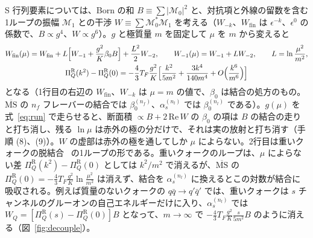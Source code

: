 \documentclass[a4paper,10pt]{ltjsarticle}
\newcommand{\MSbar}{\overline{\mathrm{MS}}}
\begin{document}
S 行列要素については、Born の和 $B\equiv\sum|\mathcal M_0|^2$ と、対抗項と外線の留数を含む1ループの振幅 $\mathcal M_1$ との干渉 $W\equiv\sum\mathcal M_0^*\mathcal M_1$ を考える（$W_{-k}$、$W_{\mathrm{fin}}$ は $\epsilon^{-k}$、$\epsilon^0$ の係数で、$B\propto g^4$、$W\propto g^6$）。$g$ と極質量 $m$ を固定して $\mu$ を $m$ から変えると
\begin{equation}
\begin{gathered}
W_{\mathrm{fin}}(\mu)=W_{\mathrm{fin}}+L\Bigl[W_{-1}+\frac{g^2}{K}\beta_0B\Bigr]+\frac{L^2}2W_{-2},\qquad
W_{-1}(\mu)=W_{-1}+LW_{-2},\qquad L=\ln\frac{\mu^2}{m^2},\\
\Pi_Q^{\mathrm R}(k^2)-\Pi_Q^{\mathrm R}(0)=-\frac43T_F\frac{g^2}{K}\Bigl[\frac{k^2}{5m^2}+\frac{3k^4}{140m^4}+O\Bigl(\frac{k^6}{m^6}\Bigr)\Bigr]
\end{gathered}
\label{eq:rgW}
\end{equation}
となる（1行目の右辺の $W_{\mathrm{fin}}$、$W_{-k}$ は $\mu=m$ の値で、$\beta_0$ は結合の処方のもの。$\MSbar$ の $n_f$ フレーバーの結合では $\beta_0^{(n_f)}$、$\alpha_s^{(n_l)}$ では $\beta_0^{(n_l)}$ である）。$g(\mu)$ を式~\eqref{eq:run} で走らせると、断面積 $\propto B+2\,\mathrm{Re}\,W$ の $\beta_0$ の項は $B$ の結合の走りと打ち消し、残る $\ln\mu$ は赤外の極の分だけで、それは実の放射と打ち消す（手順 (8)、(9)）。$W$ の虚部は赤外の極を通してしか $\mu$ によらない。2行目は重いクォークの脱結合~\cite{ac75} の1ループの形である。重いクォークのループは、$\mu$ によらない差 $\Pi_Q^{\mathrm R}(k^2)-\Pi_Q^{\mathrm R}(0)$ としては $k^2/m^2$ で消えるが、$\MSbar$ の $\Pi_Q^{\mathrm R}(0)=-\frac43T_F\frac{g^2}K\ln\frac{\mu^2}{m^2}$ は消えず、結合を $\alpha_s^{(n_l)}$ に換えるとこの対数が結合に吸収される。例えば質量のないクォークの $q\bar q\to q'\bar q'$ では、重いクォークは $s$ チャンネルのグルーオンの自己エネルギーだけに入り、$\alpha_s^{(n_l)}$ では $W_Q=[\Pi_Q^{\mathrm R}(s)-\Pi_Q^{\mathrm R}(0)]B$ となって、$m\to\infty$ で $-\frac43T_F\frac{g^2}K\frac{s}{5m^2}B$ のように消える（図~\ref{fig:decouple}）。
\end{document}
